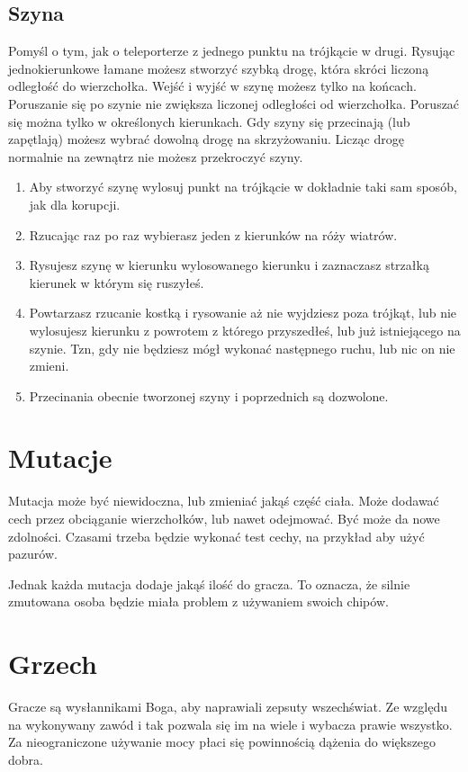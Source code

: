 \subsection{Szyna}
Pomyśl o tym, jak o teleporterze z jednego punktu na trójkącie w drugi.
Rysując jednokierunkowe łamane możesz stworzyć szybką drogę, która skróci liczoną odległość do wierzchołka.
Wejść i wyjść w szynę możesz tylko na końcach.
Poruszanie się po szynie nie zwiększa liczonej odległości od wierzchołka.
Poruszać się można tylko w określonych kierunkach.
Gdy szyny się przecinają (lub zapętlają) możesz wybrać dowolną drogę na skrzyżowaniu.
Licząc drogę normalnie na zewnątrz nie możesz przekroczyć szyny.

\begin{enumerate}
 \item Aby stworzyć szynę wylosuj punkt na trójkącie w dokładnie taki sam sposób, jak dla korupcji.
 \item Rzucając raz po raz \dvi{} wybierasz jeden z kierunków na róży wiatrów. 
 \item Rysujesz szynę w kierunku wylosowanego kierunku i zaznaczasz strzałką kierunek w którym się ruszyłeś.
 \item Powtarzasz rzucanie kostką i rysowanie aż nie wyjdziesz poza trójkąt, lub nie wylosujesz kierunku z powrotem z którego przyszedłeś, lub już istniejącego na szynie. Tzn, gdy nie będziesz mógł wykonać następnego ruchu, lub nic on nie zmieni.
 \item Przecinania obecnie tworzonej szyny i poprzednich są dozwolone.
\end{enumerate}

\section{Mutacje}
Mutacja może być niewidoczna, lub zmieniać jakąś część ciała.
Może dodawać cech przez obciąganie wierzchołków, lub nawet odejmować.
Być może da nowe zdolności.
Czasami trzeba będzie wykonać test cechy, na przykład aby użyć pazurów.

Jednak każda mutacja dodaje jakąś ilość \abnkp{} do gracza.
To oznacza, że silnie zmutowana osoba będzie miała problem z używaniem swoich chipów.

\section{Grzech}
Gracze są wysłannikami Boga, aby naprawiali zepsuty wszechświat.
Ze względu na wykonywany zawód i tak pozwala się im na wiele i wybacza prawie wszystko.
Za nieograniczone używanie mocy płaci się powinnością dążenia do większego dobra.

